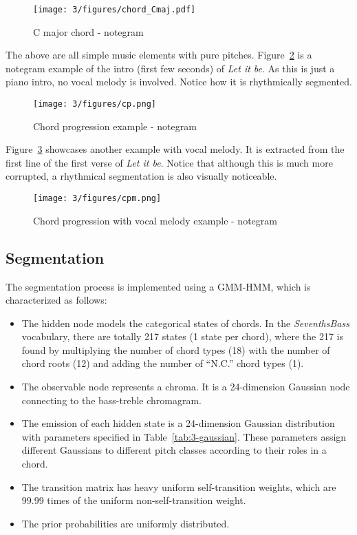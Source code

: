 \begin{figure}
\centering
\texttt{[image: 3/figures/chord\_Cmaj.pdf]}
\caption{C major chord - notegram}
\label{fig:3-chord_Cmaj}
\end{figure}

The above are all simple music elements with pure pitches. Figure~\ref{fig:3-cp} is a notegram example of the intro (first few seconds) of {\it Let it be}. As this is just a piano intro, no vocal melody is involved. Notice how it is rhythmically segmented.
\begin{figure}
\centering
\texttt{[image: 3/figures/cp.png]}
\caption{Chord progression example - notegram}
\label{fig:3-cp}
\end{figure}

Figure~\ref{fig:3-cpm} showcases another example with vocal melody. It is extracted from the first line of the first verse of {\it Let it be}. Notice that although this is much more corrupted, a rhythmical segmentation is also visually noticeable.
\begin{figure}
\centering
\texttt{[image: 3/figures/cpm.png]}
\caption{Chord progression with vocal melody example - notegram}
\label{fig:3-cpm}
\end{figure}

\newpage
\subsection{Segmentation} \label{sec:3-sg}
The segmentation process is implemented using a GMM-HMM, which is characterized as follows:
\begin{itemize}
	\item The hidden node models the categorical states of chords. In the \textit{SeventhsBass} vocabulary, there are totally 217 states (1 state per chord), where the 217 is found by multiplying the number of chord types (18) with the number of chord roots (12) and adding the number of ``N.C.'' chord types (1).
	
	\item The observable node represents a chroma. It is a 24-dimension Gaussian node connecting to the bass-treble chromagram.
	
	\item The emission of each hidden state is a 24-dimension Gaussian distribution with parameters specified in Table~\ref{tab:3-gaussian}. These parameters assign different Gaussians to different pitch classes according to their roles in a chord.
	
	\item The transition matrix has heavy uniform self-transition weights, which are 99.99 times of the uniform non-self-transition weight.
	
	\item The prior probabilities are uniformly distributed.
\end{itemize}

